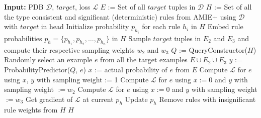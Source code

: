 \documentclass[akbc,twoside,11pt]{article}
\newcounter{example}
\newcommand{\algorithmname}{SafeLearner\xspace}
\begin{document}
\begin{algorithm}
\begin{small}
\caption{\algorithmname\ -- Main Algorithm}\label{alg:main}
\begin{algorithmic}[1]
\State \textbf{Input:} PDB $\mathcal{D}$, $target$, loss $\mathcal{L}$
\State $E$ := Set of all $target$ tuples in $\mathcal{D}$
\State $H$ := Set of all the type consistent and significant (deterministic) rules from AMIE+ using $\mathcal{D}$ with $target$ in head \label{alg_line:amie}
\State Initialize probability $p_{h_i}$ for each rule $h_i$ in $H$ \label{alg_line:init1}
\State Embed rule probabilities $p_h = \{p_{h_1}, p_{h_2}, \ldots, p_{h_n}\}$ in $H$ \label{alg_line:init2}
\State Sample $target$ tuples in $E_2$ and $E_3$ and compute their respective sampling weights $w_2$ and $w_3$ \label{alg_line:samp}
\State $Q$ := QueryConstructor($H$)  \label{alg_line:QC}
 \label{alg_line:SGD1}
    \State Randomly select an example $e$ from all the target examples $E \cup E_2 \cup E_3$
    \State $y$ := ProbabilityPredictor($Q$, $e$)  \label{alg_line:PP}
        \State $x$ := actual probability of $e$ from $E$
        \State Compute $\mathcal{L}$ for $e$ using $x$, $y$ with sampling weight := 1
        \State Compute $\mathcal{L}$ for $e$ using $x := 0$ and $y$ with sampling weight $:= w_2$
        \State Compute $\mathcal{L}$ for $e$ using $x := 0$ and $y$ with sampling weight $:= w_3$
    \EndIf \State Get gradient of $\mathcal{L}$ at current $p_h$
    \State Update $p_h$
\EndFor \label{alg_line:SGD2}
\State Remove rules with insignificant rule weights from $H$ \label{alg_line:prune}
\State \Return $H$
\end{algorithmic}
\end{small}
\end{algorithm}
\end{document}
